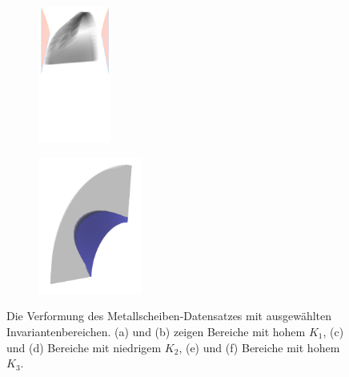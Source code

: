 \documentclass[a4paper,fontsize=12pt,toc=bib,halfparskip,ngerman]{scrartcl}
\begin{document}
\begin{figure}
\begin{subfigure}{0.49\textwidth}
		\subcaption{}
		\label{MetalDiskStrainObject2}
	\end{subfigure}
	\medskip
	\begin{subfigure}{0.49\textwidth}
		\centering
		\includegraphics[height=4.5cm]{pictures/results/MetalDisk/strain/cylindrical/MetalDiskStrain_InvariantSpace3.png}
		\subcaption{}
		\label{MetalDiskStrainInvariant3}
	\end{subfigure}
	\hspace*{\fill}
	\begin{subfigure}{0.49\textwidth}
		\centering
		\includegraphics[height=4.5cm]{pictures/results/MetalDisk/strain/MetalDiskStrain_Object3.png}
		\subcaption{}
		\label{MetalDiskStrainObject3}
	\end{subfigure}
	\caption{Die Verformung des Metallscheiben-Datensatzes mit ausgew\"ahlten Invariantenbereichen. (a) und (b) zeigen Bereiche mit hohem $K_1$, (c) und (d) Bereiche mit niedrigem $K_2$, (e) und (f) Bereiche mit hohem $K_3$.}
	\label{MetalDiskStrainInteraction}
\end{figure}
\end{document}
